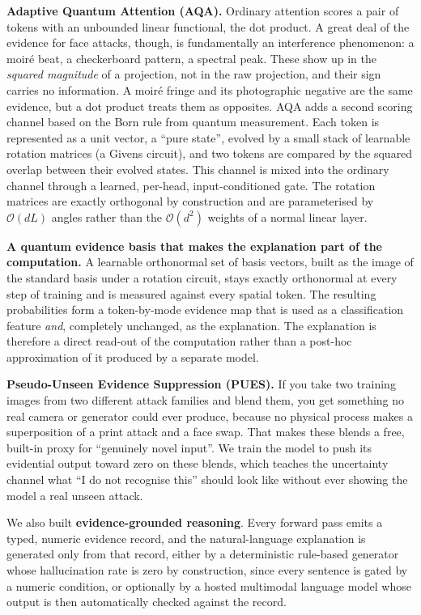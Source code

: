 \documentclass[conference]{IEEEtran}
\begin{document}
\textbf{Adaptive Quantum Attention (AQA).} Ordinary attention scores a pair of
tokens with an unbounded linear functional, the dot product. A great deal of the
evidence for face attacks, though, is fundamentally an interference phenomenon: a
moir\'e beat, a checkerboard pattern, a spectral peak. These show up in the
\emph{squared magnitude} of a projection, not in the raw projection, and their sign
carries no information. A moir\'e fringe and its photographic negative are the same
evidence, but a dot product treats them as opposites. AQA adds a second scoring
channel based on the Born rule from quantum measurement. Each token is represented
as a unit vector, a ``pure state'', evolved by a small stack of learnable rotation
matrices (a Givens circuit), and two tokens are compared by the squared overlap
between their evolved states. This channel is mixed into the ordinary channel
through a learned, per-head, input-conditioned gate. The rotation matrices are
exactly orthogonal by construction and are parameterised by $\mathcal{O}(dL)$ angles
rather than the $\mathcal{O}(d^{2})$ weights of a normal linear layer.

\textbf{A quantum evidence basis that makes the explanation part of the
computation.} A learnable orthonormal set of basis vectors, built as the image of
the standard basis under a rotation circuit, stays exactly orthonormal at every
step of training and is measured against every spatial token. The resulting
probabilities form a token-by-mode evidence map that is used as a classification
feature \emph{and}, completely unchanged, as the explanation. The explanation is
therefore a direct read-out of the computation rather than a post-hoc approximation
of it produced by a separate model.

\textbf{Pseudo-Unseen Evidence Suppression (PUES).} If you take two training images
from two different attack families and blend them, you get something no real camera
or generator could ever produce, because no physical process makes a superposition
of a print attack and a face swap. That makes these blends a free, built-in proxy
for ``genuinely novel input''. We train the model to push its evidential output
toward zero on these blends, which teaches the uncertainty channel what ``I do not
recognise this'' should look like without ever showing the model a real unseen
attack.

We also built \textbf{evidence-grounded reasoning}. Every forward pass emits a
typed, numeric evidence record, and the natural-language explanation is generated
only from that record, either by a deterministic rule-based generator whose
hallucination rate is zero by construction, since every sentence is gated by a
numeric condition, or optionally by a hosted multimodal language model whose output
is then automatically checked against the record.
\end{document}
